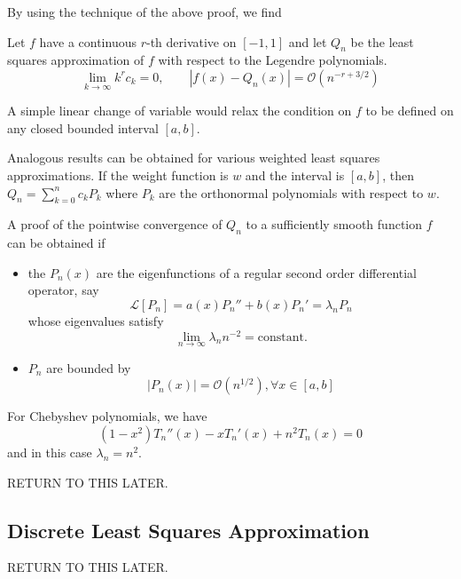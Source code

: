 \documentclass[../main.tex]{subfiles}
\begin{document}
By using the technique of the above proof, we find
\begin{theorem}{}{}
	Let $f$ have a continuous $r$-th derivative on $[-1,1]$ and let $Q_n$ be the least squares approximation of $f$ with respect to the Legendre polynomials.
	\begin{equation}
		\lim_{k \to \infty} k^r c_k = 0, \qquad |f(x) - Q_n(x)| = \mathcal{O}(n^{-r+3/2})
	\end{equation}
\end{theorem}
A simple linear change of variable would relax the condition on $f$ to be defined on any closed bounded interval $[a,b]$.

Analogous results can be obtained for various weighted least squares approximations. If the weight function is $w$ and the interval is $[a,b]$, then $Q_n = \sum_{k=0}^n c_k P_k$ where $P_k$ are the orthonormal polynomials with respect to $w$.

A proof of the pointwise convergence of $Q_n$ to a sufficiently smooth function $f$ can be obtained if
\begin{itemize}
	\item the $P_n(x)$ are the eigenfunctions of a regular second order differential operator, say
	      \begin{equation}
		      \mathcal{L}[P_n] = a(x) P_n'' + b(x) P_n' = \lambda_n P_n
	      \end{equation}
	      whose eigenvalues satisfy
	      \begin{equation}
		      \lim_{n \to \infty} \lambda_n n^{-2} = \text{constant}.
	      \end{equation}
	\item $P_n$ are bounded by
	      \begin{equation}
		      |P_n(x)| = \mathcal{O}(n^{1/2}), \forall x \in [a,b]
	      \end{equation}
\end{itemize}

For Chebyshev polynomials, we have
\begin{equation}
	(1-x^2) T_n''(x) - x T_n'(x) + n^2 T_n(x) = 0
\end{equation}
and in this case $\lambda_n = n^2$.

RETURN TO THIS LATER.

\subsection{Discrete Least Squares Approximation}
RETURN TO THIS LATER.
\end{document}
